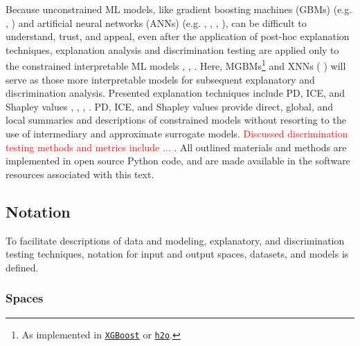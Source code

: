 \documentclass[information,article,submit,moreauthors,pdftex]{definitions/mdpi}
\begin{document}
Because unconstrained ML models, like gradient boosting machines (GBMs) (e.g. \cite{friedman2001greedy}, \cite{esl}) and artificial neural networks (ANNs) (e.g. \cite{recht2011hogwild}, \cite{hinton2012improving}, \cite{sutskever2013importance}, \cite{zeiler2012adadelta}), can be difficult to understand, trust, and appeal, even after the application of post-hoc explanation techniques, explanation analysis and discrimination testing are applied only to the constrained interpretable ML models \cite{please_stop}, \cite{fair_washing}, \cite{scaffolding}. Here, MGBMs\footnote{As implemented in \href{https://xgboost.readthedocs.io/en/latest/tutorials/monotonic.html}{\texttt{XGBoost}} or \href{https://github.com/h2oai/h2o-3/blob/master/h2o-py/demos/H2O_tutorial_gbm_monotonicity.ipynb}{\texttt{h2o}}.} and XNNs (\cite{wf_xnn} \cite{yang2019enhancing}) will serve as those more interpretable models for subsequent explanatory and discrimination analysis. Presented explanation techniques include PD, ICE, and Shapley values \cite{esl}, \cite{ice_plots}, \cite{shapley}, \cite{tree_shap}. PD, ICE, and Shapley values provide direct, global, and local summaries and descriptions of constrained models without resorting to the use of intermediary and approximate surrogate models. \textcolor{red}{Discussed discrimination testing methods and metrics include ... }. All outlined materials and methods are implemented in open source Python code, and are made available in the software resources associated with this text.  

\subsection{Notation}\label{ssec:not}

To facilitate descriptions of data and modeling, explanatory, and discrimination testing techniques, notation for input and output spaces, datasets, and models is defined.

\subsubsection{Spaces} 
 
\end{document}
